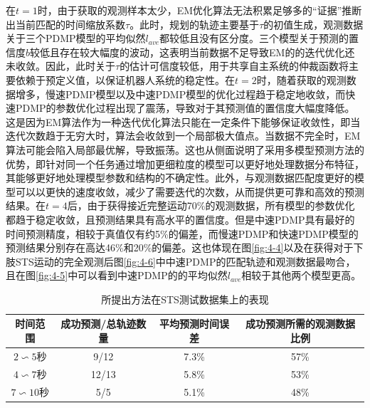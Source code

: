 在$t=1$时，由于获取的观测样本太少，EM优化算法无法积累足够多的``证据''推断出当前匹配的时间缩放系数$\tau$。此时，规划的轨迹主要基于$\tau$的初值生成，观测数据关于三个PDMP模型的平均似然$l_{ave}$都较低且没有区分度。三个模型关于预测的置信度$b$较低且存在较大幅度的波动，这表明当前数据不足导致EM的的迭代优化还未收敛。因此，此时关于$\tau$的估计可信度较低，用于共享自主系统的仲裁函数将主要依赖于预定义值，以保证机器人系统的稳定性。在$t=2$时，随着获取的观测数据增多，慢速PDMP模型以及中速PDMP模型的优化过程趋于稳定地收敛，而快速PDMP的参数优化过程出现了震荡，导致对于其预测值的置信度大幅度降低。这是因为EM算法作为一种迭代优化算法只能在一定条件下能够保证收敛性，即当迭代次数趋于无穷大时，算法会收敛到一个局部极大值点。当数据不完全时，EM算法可能会陷入局部最优解，导致振荡。这也从侧面说明了采用多模型预测方法的优势，即针对同一个任务通过增加更细粒度的模型可以更好地处理数据分布特征，其能够更好地处理模型参数和结构的不确定性。此外，与观测数据匹配度更好的模型可以以更快的速度收敛，减少了需要迭代的次数，从而提供更可靠和高效的预测结果。在$t=4$后，由于获得接近完整运动70\%的观测数据，所有模型的参数优化都趋于稳定收敛，且预测结果具有高水平的置信度。但是中速PDMP具有最好的时间预测精度，相较于真值仅有约5\%的偏差，而慢速PDMP和快速PDMP模型的预测结果分别存在高达46\%和20\%的偏差。这也体现在图\ref{fig:4-4}以及在获得对于下肢STS运动的完全观测后图\ref{fig:4-6}中中速PDMP的匹配轨迹和观测数据最吻合，且在图\ref{fig:4-5}中可以看到中速PDMP的的平均似然$l_{ave}$相较于其他两个模型更高。
\begin{table}[htb]
    \centering
    \caption{所提出方法在STS测试数据集上的表现}
    \setlength{\tabcolsep}{5pt}
    \begin{tabular}{c c c c}
    \hline\hline
     时间范围 & 成功预测/总轨迹数量 & 平均预测时间误差 & 成功预测所需的观测数据比例\\  
    \hline
    $2\backsim 5$秒& 9/12 & 7.3\%& 57\%\\ 
    $4\backsim 7$秒& 12/13 & 5.8\%& 53\%\\ 
    $7\backsim 10$秒& 5/5 & 5.1\%& 48\%\\ 
    \hline\hline
    \end{tabular}
    \label{tab:4-1}
\end{table}    


